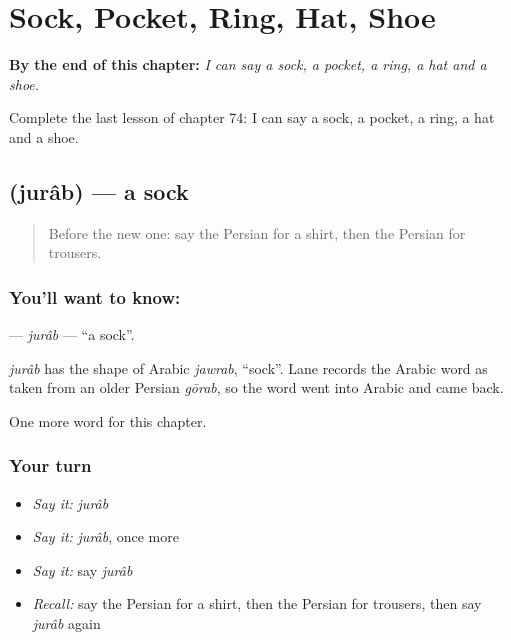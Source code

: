 
\chapter{Sock, Pocket, Ring, Hat, Shoe}
\label{ch:fa-sock-pocket-ring-hat-shoe}

\begin{chapteropening}
\textbf{By the end of this chapter:} \emph{I can say a sock, a pocket, a ring, a hat and a shoe.}

Complete the last lesson of chapter 74: I can say a sock, a pocket, a ring, a hat and a shoe.
\end{chapteropening}

\section[\texorpdfstring{\fa{جوراب} (jurâb)}{جوراب (jurâb)}]{ (jurâb) — a sock}

\label{lesson:FA-C74-jurab}



\begin{quote}
Before the new one: say the Persian for a shirt, then the Persian for trousers.
\end{quote}

\subsection*{You'll want to know: }
\textbf{} — \emph{jurâb} — \textquotedblleft{}a sock\textquotedblright{}.

\begin{cousinweb}
\emph{jurâb} has the shape of Arabic \emph{jawrab}, \textquotedblleft{}sock\textquotedblright{}. Lane records the Arabic word as taken from an older Persian \emph{gōrab}, so the word went into Arabic and came back.
\end{cousinweb}

\begin{grammarlens}[title={What you've built}]
One more word for this chapter.
\end{grammarlens}

\subsection*{Your turn}
\begin{itemize}
\raggedright
  \item \emph{Say it:} \emph{jurâb}
  \item \emph{Say it:} \emph{jurâb}, once more
  \item \emph{Say it:} say \emph{jurâb}
  \item \emph{Recall:} say the Persian for a shirt, then the Persian for trousers, then say \emph{jurâb} again
\end{itemize}

